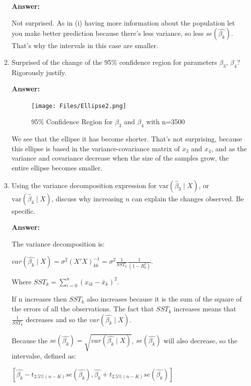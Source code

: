 \documentclass[12pt,a4paper]{article}
\begin{document}
\begin{enumerate}[label=(\roman*)]
  \textbf{Answer:}

  Not surprised. As in (i) having more information about the population let you make better prediction because there's less variance, so less $se(\hat{\beta_k})$. That's why the intervals in this case are smaller.
  
  
  \item Surprised of the change of the 95\% confidence region for parameters $\beta_3$, $\beta_4$? Rigorously justify.
  
  \textbf{Answer:} 

  \begin{figure}[H]  %
      \centering
      \texttt{[image: Files/Ellipse2.png]}
      \caption{95\% Confidence Region for $\beta_3$ and $\beta_4$ with n=3500}
      \label{fig:ellipse2}
    \end{figure}

  We see that the ellipse it has become shorter. That's not surprising, because this ellipse is based in the variance-covariance matrix of $x_3$ and $x_4$, and as the variance and covariance decrease when the size of the samples grow, the entire ellipse becomes smaller. 
  
  \item Using the variance decomposition expression for $\text{var}(\hat{\beta}_3 \mid X)$, or $\text{var}(\hat{\beta}_4 \mid X)$, discuss why increasing $n$ can explain the changes observed. Be specific.
  
  \textbf{Answer:} 

The variance decomposition is:
\begin{center}
    
$var(\hat{\beta_k}\mid X) = \sigma^2(X'X)^{-1}_{kk}= \sigma^2 \frac{1}{SST_k} \frac{1}{(1-R_k^2)}$.
\end{center}

Where $SST_k = \sum^n_{i=0}(x_{ik}-\bar{x}_k)^2$. 

If n increases then $SST_k$ also increases because it is the sum of the square of the errors of all the observations. The fact that $SST_k$ increases means that $\frac{1}{SST_k}$ decreases and so the $var(\hat{\beta_k}\mid X)$. 

Because the $se(\hat{\beta_k}) = \sqrt{var(\hat{\beta_k}\mid X)}$, $se(\hat{\beta_k})$ will also decrease, so the intervalse, defined as:

\begin{center}
   $[\hat{\beta_k} - t_{2.5\%(n-K)} se(\hat{\beta_k}), \hat{\beta_k} + t_{2.5\%(n-K)} se(\hat{\beta_k})]$ 
\end{center}


\end{enumerate}
\end{document}
